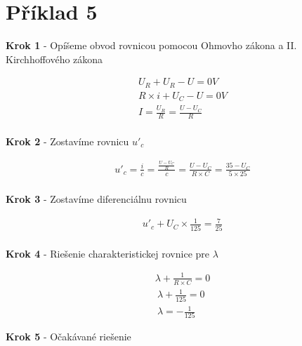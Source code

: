 \section{Příklad 5}

\begin{center}
    \textbf{Krok 1} - Opíšeme obvod rovnicou pomocou Ohmovho zákona a II. Kirchhoffového zákona
\end{center}

\begin{gather*}
    U_R + U_R - U = 0 V \\
    R \times i + U_C - U = 0 V \\
    I = \frac {U_{R}} {R} = \frac {U - U_{C}} {R} \\
\end{gather*}


\begin{center}
    \textbf{Krok 2} - Zostavíme rovnicu ${u'_{c}}$
\end{center}

\begin{gather*}
    u'_{c} = \frac {i} {c} = \frac {\frac {U - U_{C}} {R}} {c} = \frac {U - U_{C}} {R \times C} = \frac  {35 - U_{C}} {5 \times 25} \\
\end{gather*}
 

\begin{center}
    \textbf{Krok 3} - Zostavíme diferenciálnu rovnicu
\end{center}

\begin{gather*}
    u'_{c} + U_{C} \times \frac {1} {125} = \frac {7} {25} \\
\end{gather*}

\newpage 

\begin{center}
    \textbf{Krok 4} - Riešenie charakteristickej rovnice pre ${\lambda}$
\end{center}

\begin{gather*}
    \lambda + \frac {1} {R \times C} = 0 \\\
    \lambda + \frac {1} {125} = 0 \\\
    \lambda = - \frac {1} {125} \
\end{gather*}

\begin{center}
    \textbf{Krok 5} - Očakávané riešenie
\end{center}

